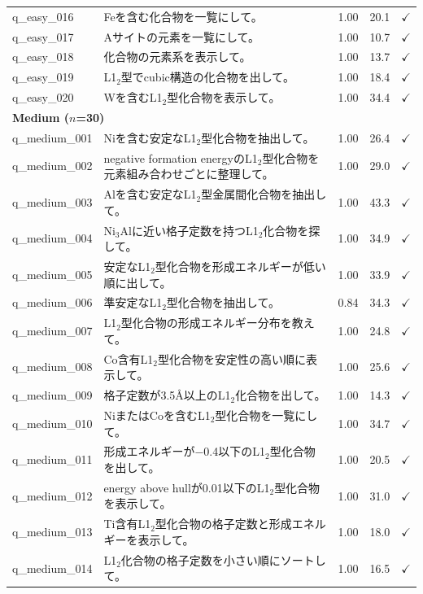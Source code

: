 \documentclass{npj-compt.mater}
\begin{document}
\begin{longtable}{lp{8.5cm}ccl}
    q\_easy\_016 & Feを含む化合物を一覧にして。 & 1.00 & 20.1 & $\checkmark$ \\
    q\_easy\_017 & Aサイトの元素を一覧にして。 & 1.00 & 10.7 & $\checkmark$ \\
    q\_easy\_018 & 化合物の元素系を表示して。 & 1.00 & 13.7 & $\checkmark$ \\
    q\_easy\_019 & L1$_2$型でcubic構造の化合物を出して。 & 1.00 & 18.4 & $\checkmark$ \\
    q\_easy\_020 & Wを含むL1$_2$型化合物を表示して。 & 1.00 & 34.4 & $\checkmark$ \\
    \midrule
    \multicolumn{5}{l}{\textbf{Medium ($n$=30)}} \\
    \midrule
    q\_medium\_001 & Niを含む安定なL1$_2$型化合物を抽出して。 & 1.00 & 26.4 & $\checkmark$ \\
    q\_medium\_002 & negative formation energyのL1$_2$型化合物を元素組み合わせごとに整理して。 & 1.00 & 29.0 & $\checkmark$ \\
    q\_medium\_003 & Alを含む安定なL1$_2$型金属間化合物を抽出して。 & 1.00 & 43.3 & $\checkmark$ \\
    q\_medium\_004 & Ni$_3$Alに近い格子定数を持つL1$_2$化合物を探して。 & 1.00 & 34.9 & $\checkmark$ \\
    q\_medium\_005 & 安定なL1$_2$型化合物を形成エネルギーが低い順に出して。 & 1.00 & 33.9 & $\checkmark$ \\
    q\_medium\_006 & 準安定なL1$_2$型化合物を抽出して。 & 0.84 & 34.3 & $\checkmark$ \\
    q\_medium\_007 & L1$_2$型化合物の形成エネルギー分布を教えて。 & 1.00 & 24.8 & $\checkmark$ \\
    q\_medium\_008 & Co含有L1$_2$型化合物を安定性の高い順に表示して。 & 1.00 & 25.6 & $\checkmark$ \\
    q\_medium\_009 & 格子定数が3.5\AA 以上のL1$_2$化合物を出して。 & 1.00 & 14.3 & $\checkmark$ \\
    q\_medium\_010 & NiまたはCoを含むL1$_2$型化合物を一覧にして。 & 1.00 & 34.7 & $\checkmark$ \\
    q\_medium\_011 & 形成エネルギーが$-$0.4以下のL1$_2$型化合物を出して。 & 1.00 & 20.5 & $\checkmark$ \\
    q\_medium\_012 & energy above hullが0.01以下のL1$_2$型化合物を表示して。 & 1.00 & 31.0 & $\checkmark$ \\
    q\_medium\_013 & Ti含有L1$_2$型化合物の格子定数と形成エネルギーを表示して。 & 1.00 & 18.0 & $\checkmark$ \\
    q\_medium\_014 & L1$_2$化合物の格子定数を小さい順にソートして。 & 1.00 & 16.5 & $\checkmark$ \\

\end{longtable}
\end{document}
